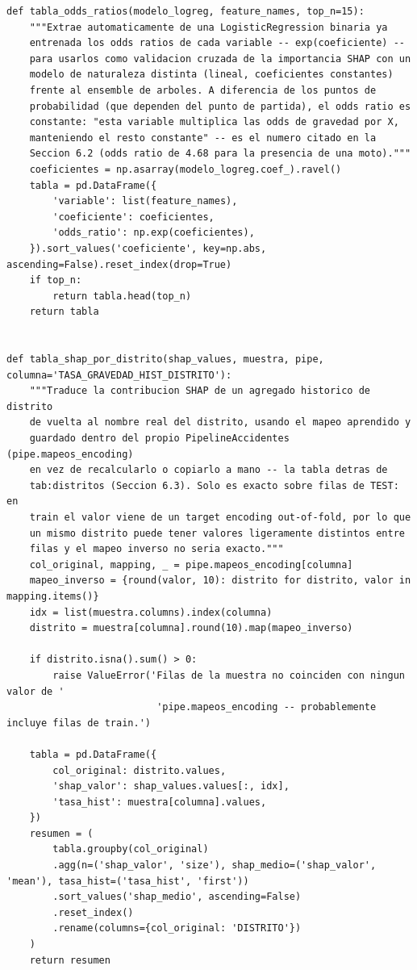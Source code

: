 \documentclass[11pt,a4paper]{article}
\begin{document}
\begin{lstlisting}[caption={Conversión de una contribución SHAP (log-odds) a puntos de probabilidad, y tabla de importancia global.}]
def tabla_odds_ratios(modelo_logreg, feature_names, top_n=15):
    """Extrae automaticamente de una LogisticRegression binaria ya
    entrenada los odds ratios de cada variable -- exp(coeficiente) --
    para usarlos como validacion cruzada de la importancia SHAP con un
    modelo de naturaleza distinta (lineal, coeficientes constantes)
    frente al ensemble de arboles. A diferencia de los puntos de
    probabilidad (que dependen del punto de partida), el odds ratio es
    constante: "esta variable multiplica las odds de gravedad por X,
    manteniendo el resto constante" -- es el numero citado en la
    Seccion 6.2 (odds ratio de 4.68 para la presencia de una moto)."""
    coeficientes = np.asarray(modelo_logreg.coef_).ravel()
    tabla = pd.DataFrame({
        'variable': list(feature_names),
        'coeficiente': coeficientes,
        'odds_ratio': np.exp(coeficientes),
    }).sort_values('coeficiente', key=np.abs, ascending=False).reset_index(drop=True)
    if top_n:
        return tabla.head(top_n)
    return tabla


def tabla_shap_por_distrito(shap_values, muestra, pipe, columna='TASA_GRAVEDAD_HIST_DISTRITO'):
    """Traduce la contribucion SHAP de un agregado historico de distrito
    de vuelta al nombre real del distrito, usando el mapeo aprendido y
    guardado dentro del propio PipelineAccidentes (pipe.mapeos_encoding)
    en vez de recalcularlo o copiarlo a mano -- la tabla detras de
    tab:distritos (Seccion 6.3). Solo es exacto sobre filas de TEST: en
    train el valor viene de un target encoding out-of-fold, por lo que
    un mismo distrito puede tener valores ligeramente distintos entre
    filas y el mapeo inverso no seria exacto."""
    col_original, mapping, _ = pipe.mapeos_encoding[columna]
    mapeo_inverso = {round(valor, 10): distrito for distrito, valor in mapping.items()}
    idx = list(muestra.columns).index(columna)
    distrito = muestra[columna].round(10).map(mapeo_inverso)

    if distrito.isna().sum() > 0:
        raise ValueError('Filas de la muestra no coinciden con ningun valor de '
                          'pipe.mapeos_encoding -- probablemente incluye filas de train.')

    tabla = pd.DataFrame({
        col_original: distrito.values,
        'shap_valor': shap_values.values[:, idx],
        'tasa_hist': muestra[columna].values,
    })
    resumen = (
        tabla.groupby(col_original)
        .agg(n=('shap_valor', 'size'), shap_medio=('shap_valor', 'mean'), tasa_hist=('tasa_hist', 'first'))
        .sort_values('shap_medio', ascending=False)
        .reset_index()
        .rename(columns={col_original: 'DISTRITO'})
    )
    return resumen
\end{lstlisting}
\end{document}
